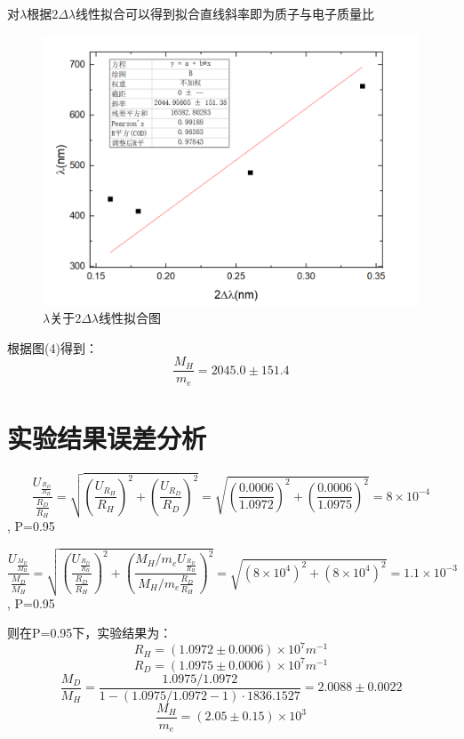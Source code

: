 \documentclass{report}
\begin{document}
对$\lambda$根据$ 2\Delta\lambda $线性拟合可以得到拟合直线斜率即为质子与电子质量比
 \begin{figure}[!h]
	\centering
	\includegraphics[scale=0.5]{质子电子比}
	\caption{\heiti{}$ \lambda $关于$ 2\Delta\lambda $线性拟合图}
	
\end{figure}


根据图(4)得到：
\begin{equation}
	\frac{M_H}{m_e}=2045.0\pm151.4 \nonumber
\end{equation}
	\section{实验结果误差分析}
\begin{equation}
 \dfrac{U_{\frac{R_D}{R_H}}}{\frac{R_D}{R_H}}=\sqrt{(\dfrac{U_{R_H}}{R_H})^2+(\dfrac{U_{R_D}}{R_D})^2}=\sqrt{(\dfrac{0.0006}{1.0972})^2+(\dfrac{0.0006}{1.0975})^2}=8\times10^{-4} \nonumber
\end{equation}
, P=0.95

\begin{equation}
	\dfrac{U_{\frac{M_D}{M_H}}}{\frac{M_D}{M_H}}=\sqrt{(\dfrac{U_{\frac{R_D}{R_H}}}{\frac{R_D}{R_H}})^2+(\dfrac{M_H/m_eU_{\frac{R_D}{R_H}}}{M_H/m_e\frac{R_D}{R_H}})^2}=\sqrt{(8\times10^4)^2+(8\times10^4)^2}=1.1\times10^{-3} \nonumber
\end{equation}  
 , P=0.95
 
 
 则在P=0.95下，实验结果为：
 \begin{equation}
 	R_H=(1.0972\pm0.0006)\times10^7 m^{-1}  \nonumber
 \end{equation}
 \begin{equation}
 	R_D=(1.0975\pm0.0006)\times10^7 m^{-1}  \nonumber
 \end{equation}
\begin{equation}
	\frac{M_D}{M_H}=\dfrac{1.0975/1.0972}{1-(1.0975/1.0972-1)\cdot1836.1527}=2.0088\pm0.0022\nonumber
\end{equation}
\begin{equation}
	\frac{M_H}{m_e}=(2.05\pm0.15)\times10^3\nonumber
\end{equation}
\end{document}
